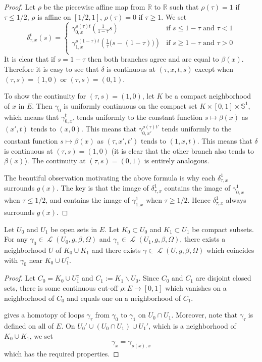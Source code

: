 \documentclass[10pt,a4paper]{article}
\newcommand{\co}{\!:}
\DeclareMathOperator{\Loop}{\mathcal{L}}
\newcommand{\uses}[1]{}
\newcommand{\lean}[1]{}
\newcommand{\leanok}{}
\begin{document}
\begin{proof}
  \leanok
  Let $ρ$ be the piecewise affine map from $ℝ$ to $ℝ$ such that
  $ρ(τ) = 1$ if $τ ≤ 1/2$, $ρ$ is affine on $[1/2, 1]$,
  $ρ(τ) = 0$ if $τ ≥ 1$.
  We set
  \[
    δ_{τ, x}^t(s) =
    \begin{cases}
      γ_{0,x}^{ρ(τ)t}\left(\frac1{1 - τ} s\right) & \text{if $s ≤ 1 - τ$ and $τ < 1$}\\
      γ_{1,x}^{ρ(1-τ)t}\left(\frac1τ \big(s - (1- τ)\big)\right) &
      \text{if $s ≥ 1 - τ$ and $τ > 0$}\\
    \end{cases}
  \]
  It is clear that if $s = 1 - τ$ then both branches agree and are equal to $β(x)$.
  Therefore it is easy to see that $δ$ is continuous at $(τ, x, t, s)$
  except when $(τ,s)=(1,0)$ or $(τ,s)=(0,1)$.

  To show the continuity for $(τ,s)=(1,0)$, let $K$ be a compact neighborhood of $x$ in $E$.
  Then $γ_0$ is uniformly continuous on the compact set $K × [0, 1] × 𝕊^1$, which means that
  $γ_{0,x'}^t$ tends uniformly to the constant function $s ↦ β(x)$ as $(x', t)$ tends to
  $(x, 0)$.
  This means that $γ_{0,x'}^{ρ(τ)t'}$ tends uniformly to the constant function $s ↦ β(x)$
  as $(τ, x', t')$ tends to $(1, x, t)$. This means that $δ$ is continuous at $(τ,s)=(1,0)$
  (it is clear that the other branch also tends to $β(x)$). The continuity at $(τ,s)=(0,1)$ is
  entirely analogous.

  The beautiful observation motivating the above formula is why each
  $δ_{τ, x}^1$ surrounds $g(x)$.
  The key is that the image of $δ_{τ, x}^1$ contains the image of
  $γ_{0,x}^1$ when $τ ≤ 1/2$, and contains  the image of
  $γ_{1,x}^1$ when $τ ≥ 1/2$.
  Hence $δ_{τ, x}^1$ always surrounds $g(x)$.
\end{proof}

\begin{corollary}
  \label{cor:extend_loops}
  \lean{extend_loops}
  \leanok
  Let $U_0$ and $U_1$ be open sets in $E$.
  Let $K_0 ⊂ U_0$ and $K_1 ⊂ U_1$ be compact subsets.
  For any $γ_0 ∈ \Loop(U_0, g, β, Ω)$ and $γ_1 ∈ \Loop(U_1, g, β, Ω)$,
  there exists a neighborhood $U$ of $K_0 ∪ K_1$ and
  there exists $γ ∈ \Loop(U, g, β, Ω)$
  which coincides with $γ_0$ near $K_0\cup U_1^c$.
\end{corollary}

\begin{proof}
  \leanok
  \uses{lem:satisfied_or_refund}
  Let $C_0 = K_0\cup U_1^c$ and $C_1 := K_1 ∖ U_0$. Since $C_0$ and $C_1$ are disjoint closed sets,
  there is some continuous cut-off $ρ \co E → [0, 1]$
  which vanishes on a neighborhood of $C_0$ and equals one on a neighborhood of $C_1$.

   gives a homotopy of loops
  $γ_τ$ from $γ_0$ to $γ_1$ on $U_0 ∩ U_1$. Moreover, note that $γ_τ$ is defined on all of $E$.
  On $U_0' ∪ (U_0 ∩ U_1) ∪ U_1'$, which is a
  neighborhood of $K_0 ∪ K_1$, we set
  \[
      γ_x = γ_{ρ(x), x}
  \]
  which has the required properties.
\end{proof}
\end{document}
